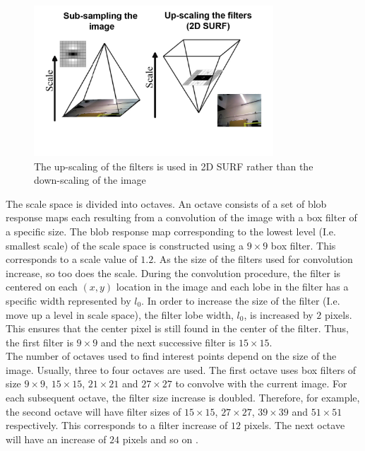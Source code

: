 \documentclass{article}
\begin{document}
\begin{figure}[h!] 
  \centering
    \includegraphics[width=0.8\textwidth]{../Drawings/methods/SURF2D_Image_pyramid.jpg}
    \caption{The up-scaling of the filters is used in 2D SURF rather than the down-scaling of the image}
    \label{fig:scaleSpace}
\end{figure}

The scale space is divided into octaves. An octave consists of a set of blob response maps each resulting from a convolution of the image with a box filter of a specific size. The blob response map corresponding to the lowest level (I.e. smallest scale) of the scale space is constructed using a $9 \times 9$ box filter. This corresponds to a scale value of $1.2$. As the size of the filters used for convolution increase, so too does the scale. During the convolution procedure, the filter is centered on each $(x,y)$ location in the image and each lobe in the filter has a specific width represented by $l_0$. In order to increase the size of the filter (I.e. move up a level in scale space), the filter lobe width, $l_0$, is increased by $2$ pixels. This ensures that the center pixel is still found in the center of the filter. Thus, the first filter is $9 \times 9$ and the next successive filter is $15 \times 15$. \\

The number of octaves used to find interest points depend on the size of the image. Usually, three to four octaves are used. The first octave uses box filters of size $9 \times 9$, $15 \times 15$, $21 \times 21$ and $27 \times 27$ to convolve with the current image.  For each subsequent octave, the filter size increase is doubled. Therefore, for example, the second octave will have filter sizes of $15 \times 15$, $27 \times 27$, $39 \times 39$ and $51 \times 51$ respectively. This corresponds to a filter increase of $12$ pixels. The next octave will have an increase of $24$ pixels and so on \cite{Bay2008}. \\
\end{document}

